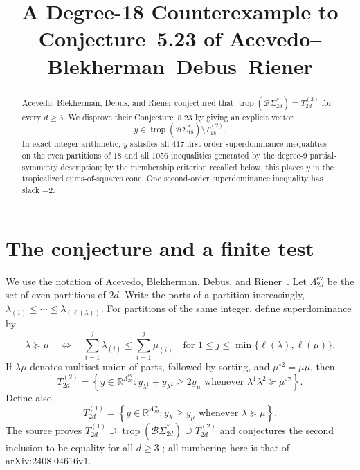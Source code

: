 \documentclass[11pt]{amsart}
\title[A degree-18 counterexample]
{A Degree-18 Counterexample to Conjecture~5.23 of
Acevedo--Blekherman--Debus--Riener}
\date{}
\DeclareMathOperator{\trop}{trop}
\newcommand{\BS}{\mathcal{B}\Sigma}
\newcommand{\EPart}{\Lambda^{\mathrm{ev}}}
\newcommand{\R}{\mathbb{R}}
\begin{document}
\begin{abstract}
Acevedo, Blekherman, Debus, and Riener conjectured that
\(\trop(\BS_{2d}^{*})=T_{2d}^{(2)}\) for every \(d\ge3\).
We disprove their Conjecture~5.23 by giving an explicit vector
\[
y\in\trop(\BS_{18}^{*})\setminus T_{18}^{(2)}.
\]
In exact integer arithmetic, \(y\) satisfies all \(417\) first-order
superdominance inequalities on the even partitions of \(18\) and all
\(1056\) inequalities generated by the degree-\(9\) partial-symmetry
description; by the membership criterion recalled below, this places
\(y\) in the tropicalized sums-of-squares cone. One second-order
superdominance inequality has slack \(-2\).
\end{abstract}

\maketitle

\section{The conjecture and a finite test}

We use the notation of Acevedo, Blekherman, Debus, and
Riener~\cite{ABDR}. Let \(\EPart_{2d}\) be the set of even
partitions of \(2d\). Write the parts of a partition increasingly,
\(
\lambda_{(1)}\le\cdots\le\lambda_{(\ell(\lambda))}
\).
For partitions of the same integer, define superdominance by
\[
\lambda\succeq\mu
\quad\Longleftrightarrow\quad
\sum_{i=1}^{j}\lambda_{(i)}
\le
\sum_{i=1}^{j}\mu_{(i)}
\quad
\text{for }1\le j\le
\min\{\ell(\lambda),\ell(\mu)\}.
\]
If \(\lambda\mu\) denotes multiset union of parts, followed by
sorting, and \(\mu^{\circ2}=\mu\mu\), then
\begin{equation}\label{eq:T2}
T_{2d}^{(2)}=
\left\{
 y\in\R^{\EPart_{2d}}:
 y_{\lambda^1}+y_{\lambda^2}\ge2y_{\mu}
 \text{ whenever }
 \lambda^1\lambda^2\succeq\mu^{\circ2}
\right\}.
\end{equation}
Define also
\[
T_{2d}^{(1)}=
\left\{
 y\in\R^{\EPart_{2d}}:
 y_{\lambda}\ge y_{\mu}
 \text{ whenever }\lambda\succeq\mu
\right\}.
\]
The source proves
\(
T_{2d}^{(1)}\supseteq\trop(\BS_{2d}^{*})\supseteq T_{2d}^{(2)}
\)
and conjectures the second inclusion to be equality for all \(d\ge3\)
\cite[Propositions~5.13 and~5.20 and Conjecture~5.23]{ABDR}; all
numbering here is that of arXiv:2408.04616v1.
\end{document}
